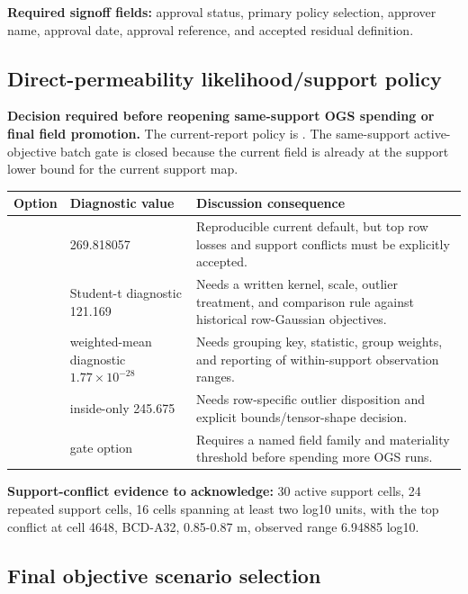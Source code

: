 \documentclass[10pt,a4paper]{article}
\newcommand{\decision}[1]{\textcolor{statusamber}{\textbf{#1}}}
\begin{document}
\textbf{Required signoff fields:} approval status, primary policy selection,
approver name, approval date, approval reference, and accepted residual
definition.

\subsection*{Direct-permeability likelihood/support policy}

\decision{Decision required before reopening same-support OGS spending or final
field promotion.} The current-report policy is
. The same-support active-objective batch
gate is closed because the current field is already at the support lower bound
for the current support map.

\begin{tabularx}{\textwidth}{@{}L{0.25\textwidth}L{0.23\textwidth}Y@{}}
\toprule
Option & Diagnostic value & Discussion consequence \\
\midrule
{} & 269.818057 & Reproducible current default, but top row losses and support conflicts must be explicitly accepted. \\
 & Student-t diagnostic 121.169 & Needs a written kernel, scale, outlier treatment, and comparison rule against historical row-Gaussian objectives. \\
 & weighted-mean diagnostic \(1.77\times10^{-28}\) & Needs grouping key, statistic, group weights, and reporting of within-support observation ranges. \\
 & inside-only 245.675 & Needs row-specific outlier disposition and explicit bounds/tensor-shape decision. \\
 & gate option & Requires a named field family and materiality threshold before spending more OGS runs. \\
\bottomrule
\end{tabularx}

\textbf{Support-conflict evidence to acknowledge:} 30 active support cells, 24
repeated support cells, 16 cells spanning at least two log10 units, with the top
conflict at cell 4648, BCD-A32, 0.85-0.87 m, observed range 6.94885 log10.

\subsection*{Final objective scenario selection}
\end{document}
